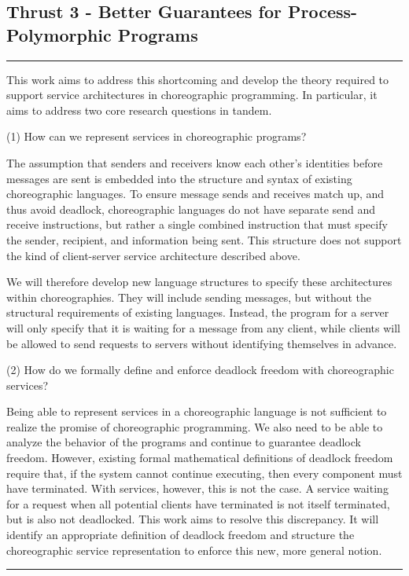 \subsection{Thrust 3 - Better Guarantees for Process-Polymorphic Programs}
\label{sec:t3}

\vspace*{0.5em}
\hrule
\vspace*{0.5em}


This work aims to address this shortcoming and develop the theory required to support service architectures in choreographic programming.
In particular, it aims to address two core research questions in tandem.

(1) How can we represent services in choreographic programs?

The assumption that senders and receivers know each other's identities before messages are sent
is embedded into the structure and syntax of existing choreographic languages.
To ensure message sends and receives match up, and thus avoid deadlock,
choreographic languages do not have separate send and receive instructions,
but rather a single combined instruction that must specify the sender, recipient, and information being sent.
This structure does not support the kind of client-server service architecture described above.

We will therefore develop new language structures to specify these architectures within choreographies.
They will include sending messages, but without the structural requirements of existing languages.
Instead, the program for a server will only specify that it is waiting for a message from any client,
while clients will be allowed to send requests to servers without identifying themselves in advance.

(2) How do we formally define and enforce deadlock freedom with choreographic services?

Being able to represent services in a choreographic language is not sufficient to realize the promise of choreographic programming.
We also need to be able to analyze the behavior of the programs and continue to guarantee deadlock freedom.
However, existing formal mathematical definitions of deadlock freedom require that,
if the system cannot continue executing, then every component must have terminated.
With services, however, this is not the case.
A service waiting for a request when all potential clients have terminated is not itself terminated, but is also not deadlocked.
This work aims to resolve this discrepancy.
It will identify an appropriate definition of deadlock freedom and structure
the choreographic service representation to enforce this new, more general notion.

\vspace*{0.5em}
\hrule
\vspace*{0.5em}




